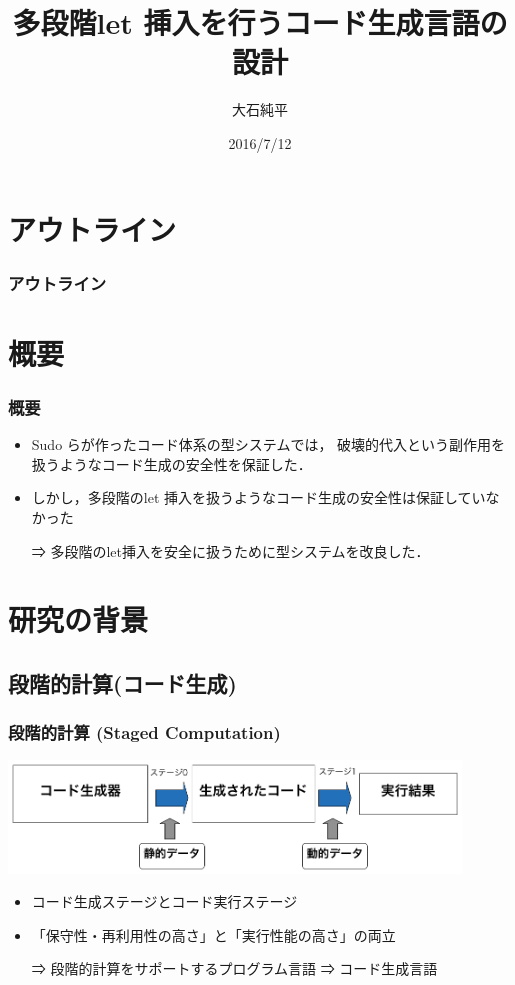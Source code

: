 \documentclass[dvipdfmx,cjk,xcolor=dvipsnames,envcountsect,notheorems,12pt]{beamer}
\title{多段階let 挿入を行うコード生成言語の設計}
\author{大石純平}
\institute[筑波大学 プログラム論理研究室]{筑波大学 大学院 \\ プログラム論理研究室}%
\date{2016/7/12}
\theoremstyle{definition}
\begin{document}
\frame[plain]{\titlepage}%

\section*{アウトライン}

\begin{frame}
  \frametitle{アウトライン}
  \tableofcontents[sectionstyle=show,subsectionstyle=hide]
\end{frame}

\section{概要}
\begin{frame}
  \frametitle{概要}
  \begin{itemize}
  \item Sudo らが作ったコード体系の型システムでは，
    \alert{破壊的代入}という副作用を扱うようなコード生成の安全性を保証した．
  \item しかし，\alert{多段階のlet 挿入}を扱うようなコード生成の安全性は保証していなかった
  \item[⇒] \alert{多段階のlet挿入}を安全に扱うために型システムを改良した．
  \end{itemize}
\end{frame}

\section{研究の背景}
\subsection{段階的計算(コード生成)}
\begin{frame}
  \frametitle{段階的計算 (Staged Computation)}
  \includegraphics[clip,width=12cm]{./img/prggen.png}

  \begin{itemize}
  \item コード生成ステージとコード実行ステージ
  \item 「保守性・再利用性の高さ」と「実行性能の高さ」の両立
  \item[⇒] 段階的計算をサポートするプログラム言語 ⇒ コード生成言語
  \end{itemize}
\end{frame}
\end{document}
